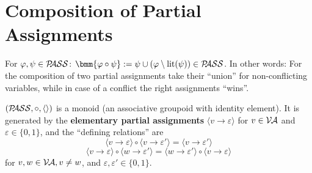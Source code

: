 \documentclass[12pt]{book}
\begin{document}
\section{Composition of Partial Assignments}
\label{sec:Compositionpass}

\begin{defi}\label{def:comppass}
      For $\varphi, \psi \in \mathcal{P\hspace{-0.32em}ASS}$: $\bmm{\vp \circ \psi} := \psi \cup (\vp \sm \lit(\psi)) \in \Pass$.
      In other words: For the composition of two partial assignments take their ``union'' for non-conflicting variables, while in case of a 
	  conflict the right assignments ``wins''.
\end{defi}
\begin{lem}\label{lem:passmon}
      $(\mathcal{P\hspace{-0.32em}ASS},\circ,\langle  \rangle)$ is a monoid (an associative groupoid with identity element). It is generated by 
      the \textbf{elementary partial assignments} $\langle v\to \varepsilon\rangle$ for $v\in \mathcal{V\hspace{-0.1em}A}$ and $\varepsilon \in \{0,1\}$, and the ``defining relations'' are
      $$\langle v\to \varepsilon \rangle \circ \langle v\to \varepsilon' \rangle = \langle v\to \varepsilon' \rangle $$
      $$\langle v\to \varepsilon \rangle \circ \langle w\to \varepsilon' \rangle = \langle w\to \varepsilon' \rangle \circ \langle v\to \varepsilon \rangle$$
      for $v, w\in \mathcal{V\hspace{-0.1em}A}, v\neq w$, and $\varepsilon, \varepsilon' \in \{0, 1\}$.
\end{lem}
\end{document}
